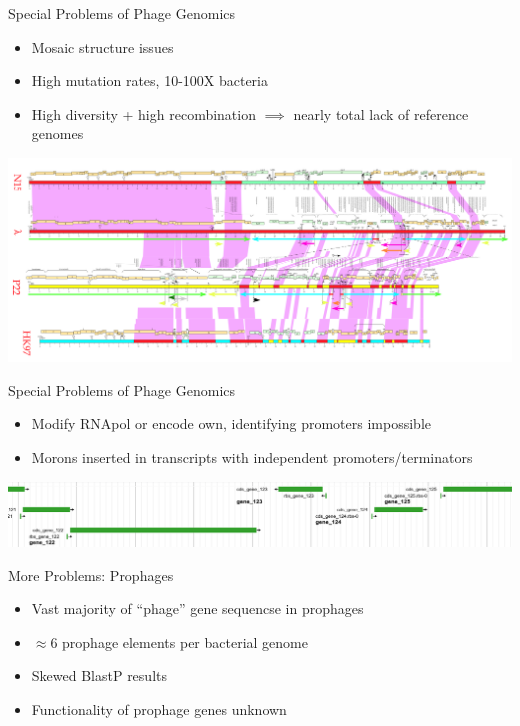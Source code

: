 \documentclass[12pt]{beamer}
\begin{document}
\begin{frame}{Special Problems of Phage Genomics}
    \begin{itemize}
        \item Mosaic structure issues
        \item High mutation rates, 10-100X bacteria
        \item High diversity + high recombination $\implies$ nearly total lack of reference genomes
    \end{itemize}
    \includegraphics[width=\textwidth]{./ALOID.png}
\end{frame}

\begin{frame}{Special Problems of Phage Genomics}
    \begin{itemize}
        \item Modify RNApol or encode own, identifying promoters impossible
        \item Morons inserted in transcripts with independent promoters/terminators
    \end{itemize}
    \centering
    \includegraphics[width=\textwidth]{./morons.png}
\end{frame}

\begin{frame}{More Problems: Prophages}
    \begin{itemize}
        \item Vast majority of ``phage'' gene sequencse in prophages
        \item $\approx$6 prophage elements per bacterial genome
        \item Skewed BlastP results
        \item Functionality of prophage genes unknown
    \end{itemize}
\end{frame}
\end{document}
